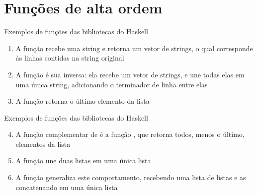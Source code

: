 \section{Funções de alta ordem}

\begin{frame}[fragile]{Exemplos de funções das bibliotecas do Haskell}

    \begin{enumerate}
        \item A função  recebe uma string e retorna um vetor de strings,
            o qual corresponde às linhas contidas na string original

        \item A função  é sua inversa: ela recebe um vetor de strings,
            e une todas elas em uma única string, adicionando o terminador de linha
            entre elas


        \item A função  retorna o último elemento da lista


    \end{enumerate}

\end{frame}

\begin{frame}[fragile]{Exemplos de funções das bibliotecas do Haskell}

    \begin{enumerate}
        \setcounter{enumi}{3}
        \item A função complementar de  é a função ,
            que retorna todos, menos o último, elementos da lista


        \item A função  une duas listas em uma única lista


        \item A função  generaliza este comportamento, recebendo uma lista
            de listas e as concatenando em uma única lista

    \end{enumerate}

\end{frame}

